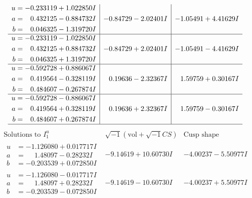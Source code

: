 \documentclass[1p]{elsarticle_modified}
\theoremstyle{definition}
\newcommand{\I}{\sqrt{-1}}
\begin{document}
$$\begin{array}{c|c|c}
\begin{aligned}
u &= -0.233119 + 1.022850 I \\
a &= \phantom{-}0.432125 - 0.884732 I \\
b &= \phantom{-}0.046325 - 1.319720 I\end{aligned}
 & -0.84729 - 2.02401 I & -1.05491 + 4.41629 I \\ \hline\begin{aligned}
u &= -0.233119 - 1.022850 I \\
a &= \phantom{-}0.432125 + 0.884732 I \\
b &= \phantom{-}0.046325 + 1.319720 I\end{aligned}
 & -0.84729 + 2.02401 I & -1.05491 - 4.41629 I \\ \hline\begin{aligned}
u &= -0.592728 + 0.886067 I \\
a &= \phantom{-}0.419564 - 0.328119 I \\
b &= \phantom{-}0.484607 - 0.267874 I\end{aligned}
 & \phantom{-}0.19636 - 2.32367 I & \phantom{-}1.59759 + 0.30167 I \\ \hline\begin{aligned}
u &= -0.592728 - 0.886067 I \\
a &= \phantom{-}0.419564 + 0.328119 I \\
b &= \phantom{-}0.484607 + 0.267874 I\end{aligned}
 & \phantom{-}0.19636 + 2.32367 I & \phantom{-}1.59759 - 0.30167 I\\
 \hline 
 \end{array}$$\newpage$$\begin{array}{c|c|c}  
\text{Solutions to }I^u_{1}& \I (\text{vol} + \sqrt{-1}CS) & \text{Cusp shape}\\
 \hline 
\begin{aligned}
u &= -1.126080 + 0.017717 I \\
a &= \phantom{-}1.48097 - 0.28232 I \\
b &= -0.203539 + 0.072850 I\end{aligned}
 & -9.14619 + 10.60730 I & -4.00237 - 5.50977 I \\ \hline\begin{aligned}
u &= -1.126080 - 0.017717 I \\
a &= \phantom{-}1.48097 + 0.28232 I \\
b &= -0.203539 - 0.072850 I\end{aligned}
 & -9.14619 - 10.60730 I & -4.00237 + 5.50977 I \\ \hline\begin{aligned}

\end{aligned}
\end{array}$$
\end{document}
